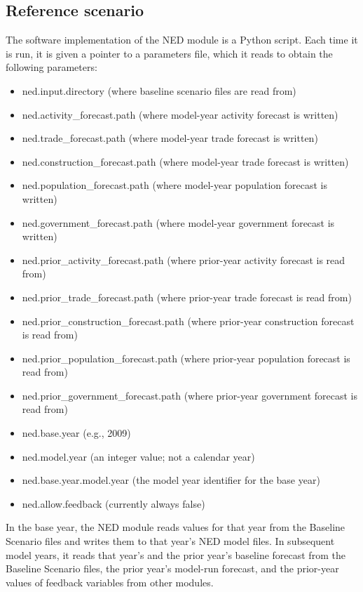 \subsection{Reference scenario}
The software implementation of the NED module is a Python script. Each time it is run, it is given a pointer to a parameters file, which it reads to obtain the following parameters:
\begin{itemize}
\item ned.input.directory (where baseline scenario files are read from)
\item ned.activity\_forecast.path (where model-year activity forecast is written)
\item ned.trade\_forecast.path (where model-year trade forecast is written)
\item ned.construction\_forecast.path (where model-year trade forecast is written)
\item ned.population\_forecast.path (where model-year population forecast is written)
\item ned.government\_forecast.path (where model-year government forecast is written)
\item ned.prior\_activity\_forecast.path (where prior-year activity forecast is read from)
\item ned.prior\_trade\_forecast.path (where prior-year trade forecast is read from)
\item ned.prior\_construction\_forecast.path (where prior-year construction forecast is read from)
\item ned.prior\_population\_forecast.path (where prior-year population forecast is read from)
\item ned.prior\_government\_forecast.path (where prior-year government forecast is read from)
\item ned.base.year (e.g., 2009)
\item ned.model.year (an integer value; not a calendar year)
\item ned.base.year.model.year (the model year identifier for the base year)
\item ned.allow.feedback (currently always false)
\end{itemize}

\noindent In the base year, the NED module reads values for that year from the Baseline Scenario files and writes them to that year's NED model files. In subsequent model years, it reads that year's and the prior year's baseline forecast from the Baseline Scenario files, the prior year's model-run forecast, and the prior-year values of feedback variables from other modules.

